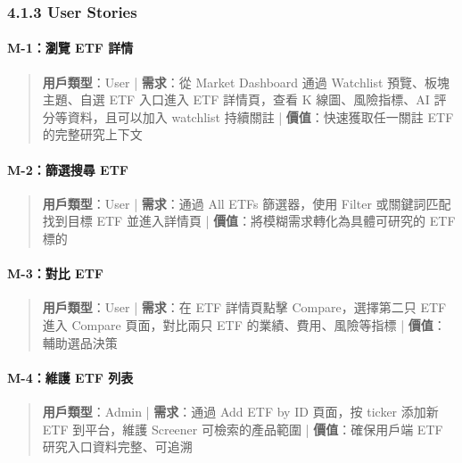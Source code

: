 \subsubsection{4.1.3 User Stories}

\paragraph{M-1：瀏覽 ETF 詳情}

\begin{quote}\small \textbf{用戶類型}：User | \textbf{需求}：從 Market Dashboard 通過 Watchlist 預覽、板塊主題、自選 ETF 入口進入 ETF 詳情頁，查看 K 線圖、風險指標、AI 評分等資料，且可以加入 watchlist 持續關註 | \textbf{價值}：快速獲取任一關註 ETF 的完整研究上下文\end{quote}


\paragraph{M-2：篩選搜尋 ETF}

\begin{quote}\small \textbf{用戶類型}：User | \textbf{需求}：通過 All ETFs 篩選器，使用 Filter 或關鍵詞匹配找到目標 ETF 並進入詳情頁 | \textbf{價值}：將模糊需求轉化為具體可研究的 ETF 標的\end{quote}


\paragraph{M-3：對比 ETF}

\begin{quote}\small \textbf{用戶類型}：User | \textbf{需求}：在 ETF 詳情頁點擊 Compare，選擇第二只 ETF 進入 Compare 頁面，對比兩只 ETF 的業績、費用、風險等指標 | \textbf{價值}：輔助選品決策\end{quote}


\paragraph{M-4：維護 ETF 列表}

\begin{quote}\small \textbf{用戶類型}：Admin | \textbf{需求}：通過 Add ETF by ID 頁面，按 ticker 添加新 ETF 到平台，維護 Screener 可檢索的產品範圍 | \textbf{價值}：確保用戶端 ETF 研究入口資料完整、可追溯\end{quote}

